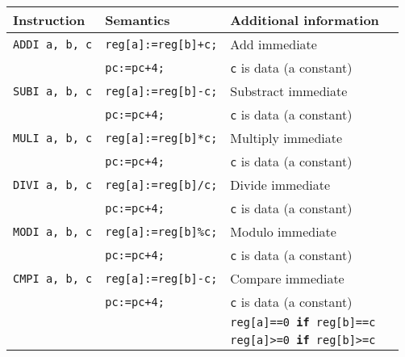\par{
    \noindent
    \begin{tabular}{llll}
        \hline
        Instruction 			& Semantics 							& Additional information 								\\
        \hline
        \hline
        \texttt{ADDI a, b, c}   &   \texttt{reg[a]:=reg[b]+c;}          &   Add immediate                                       \\
                                &   \texttt{pc:=pc+4;}                  &   \texttt{c} is data (a constant)                     \\
        \texttt{SUBI a, b, c}   &   \texttt{reg[a]:=reg[b]-c;}          &   Substract immediate                                 \\
                                &   \texttt{pc:=pc+4;}                  &   \texttt{c} is data (a constant)                     \\
        \texttt{MULI a, b, c}   &   \texttt{reg[a]:=reg[b]*c;}          &   Multiply immediate                                  \\
                                &   \texttt{pc:=pc+4;}                  &   \texttt{c} is data (a constant)                     \\
        \texttt{DIVI a, b, c}   &   \texttt{reg[a]:=reg[b]/c;}          &   Divide immediate                                    \\
                                &   \texttt{pc:=pc+4;}                  &   \texttt{c} is data (a constant)                     \\
        \texttt{MODI a, b, c}   &   \texttt{reg[a]:=reg[b]\%c;}         &   Modulo immediate                                    \\
                                &   \texttt{pc:=pc+4;}                  &   \texttt{c} is data (a constant)                     \\
        \texttt{CMPI a, b, c}   &   \texttt{reg[a]:=reg[b]-c;}          &   Compare immediate                                   \\
                                &   \texttt{pc:=pc+4;}                  &   \texttt{c} is data (a constant)                     \\
                                &                                       &   \texttt{reg[a]==0 \textbf{if} reg[b]==c}            \\
                                &                                       &   \texttt{reg[a]>=0 \textbf{if} reg[b]>=c}            \\

\end{tabular}}
